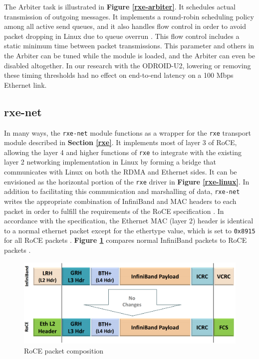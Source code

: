 \documentclass[11pt]{book}
\begin{document}
The Arbiter task is illustrated in \textbf{Figure \ref{rxe-arbiter}}. It
schedules actual transmission of outgoing messages. It implements a round-robin
scheduling policy among all active send queues, and it also handles flow control
in order to avoid packet dropping in Linux due to queue overrun
\cite{pearson-10}. This flow control includes a static minimum time between
packet transmissions. This parameter and others in the Arbiter can be tuned
while the module is loaded, and the Arbiter can even be disabled
altogether. In our research with the ODROID-U2, lowering or removing these
timing thresholds had no effect on end-to-end latency on a 100 Mbps Ethernet
link.

\subsection{\textbf{rxe-net}}

In many ways, the \verb;rxe-net; module functions as a wrapper for the
\verb;rxe; transport module described in \textbf{Section \ref{rxe}}. It
implements most of layer 3 of RoCE, allowing the layer 4 and higher functions of
\verb;rxe; to integrate with the existing layer 2 networking implementation in
Linux by forming a bridge that communicates with Linux on both the RDMA and
Ethernet sides. It can be envisioned as the horizontal portion of the \verb;rxe;
driver in \textbf{Figure \ref{rxe-linux}}. In addition to facilitating this
communication and marshalling of data, \verb;rxe-net; writes the appropriate
combination of InfiniBand and MAC headers to each packet in order to fulfill the
requirements of the RoCE specification \cite{pearson-10}
\cite{InfiniBandTARoCE-10}. In accordance with the specification, the Ethernet
MAC (layer 2) header is identical to a normal ethernet packet except for the
ethertype value, which is set to \verb;0x8915; for all RoCE packets
\cite{InfiniBandTARoCE-10}. \textbf{Figure \ref{roce-packet}} compares normal
InfiniBand packets to RoCE packets \cite{ayoub-11} \cite{InfiniBandTABase-07}
\cite{InfiniBandTARoCE-10}.

\begin{figure}[h]
\includegraphics[width=\textwidth]{roce_packet}
\caption{RoCE packet composition \cite{ayoub-11}}
\label{roce-packet}
\end{figure}
\end{document}
